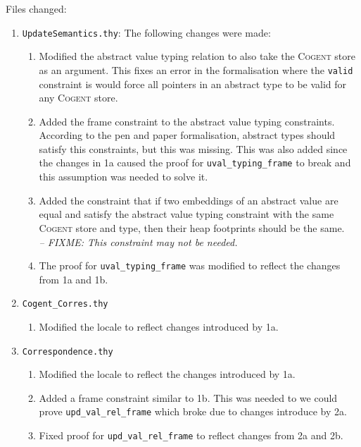 \documentclass{article}
\newcommand{\Cogent}{\textsc{Cogent}\xspace}
\begin{document}
Files changed:
\begin{enumerate}
\item \verb!UpdateSemantics.thy!: The following changes were made:
\begin{enumerate}
\item Modified the abstract value typing relation to also take the \Cogent
store as an argument. This fixes an error in the formalisation where
the \texttt{valid} constraint is would force all pointers in an
abstract type to be valid for any \Cogent store.
\item Added the frame constraint to the abstract value typing constraints.
According to the pen and paper formalisation, abstract types should
satisfy this constraints, but this was missing.
This was also added since the changes in 1a caused the proof for
\texttt{uval\_typing\_frame} to break and this assumption was
needed to solve it.
\item Added the constraint that if two embeddings of an abstract value are
equal and satisfy the abstract value typing constraint with the same
\Cogent store and type, then their heap footprints should be the
same.\\
\textit{-- FIXME: This constraint may not be needed.}
\item The proof for \texttt{uval\_typing\_frame} was modified to reflect
the changes from 1a and 1b.
\end{enumerate}
\item \verb!Cogent_Corres.thy!
\begin{enumerate}
\item Modified the locale to reflect changes introduced by 1a.
\end{enumerate}
\item \verb!Correspondence.thy!
\begin{enumerate}
\item Modified the locale to reflect the changes introduced by 1a.
\item Added a frame constraint similar to 1b.
This was needed to we could prove \texttt{upd\_val\_rel\_frame} which broke
due to changes introduce by 2a.
\item Fixed proof for \texttt{upd\_val\_rel\_frame} to reflect changes from
2a and 2b.
\end{enumerate}
\end{enumerate}
\end{document}

